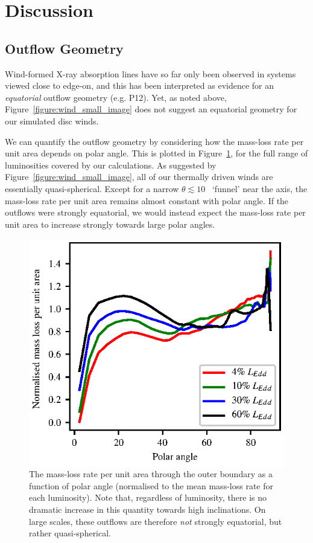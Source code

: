 \documentclass[a4paper,fleqn,usenatbib]{mnras}
\begin{document}
\section{Discussion}
\label{section:discussion}

\subsection{Outflow Geometry}

Wind-formed X-ray absorption lines have so far only been observed in 
systems viewed close to edge-on, and this has been interpreted as
evidence for an {\em equatorial} outflow geometry
(e.g. P12). Yet, as noted above,
Figure~\ref{figure:wind_small_image} does not suggest an equatorial
geometry for our simulated disc winds.

We can quantify the outflow geometry by considering how the mass-loss
rate per unit area depends on polar angle. This is plotted in
Figure~\ref{figure:geometry1}, for the full range of luminosities covered
by our calculations. As suggested by
Figure~\ref{figure:wind_small_image}, all of our thermally driven
winds are essentially quasi-spherical. Except for a narrow $\theta
\lesssim 10$\degree~ `funnel' near the axis, the mass-loss rate per
unit area remains almost constant with polar angle. If the outflows
were strongly equatorial, we would instead expect the mass-loss rate
per unit area to increase strongly towards large polar angles.

\begin{figure}
\includegraphics[width=\columnwidth]{figures/fig2.eps}
\caption{The mass-loss rate per unit area through the
outer boundary  as a function 
of polar angle (normalised to the mean mass-loss rate for each
luminosity). Note that, regardless of luminosity, there is no dramatic 
increase in this quantity towards high inclinations. On large scales,
 these outflows are therefore {\em not} strongly equatorial, but rather 
 quasi-spherical.}
\label{figure:geometry1}
\end{figure}
\end{document}
